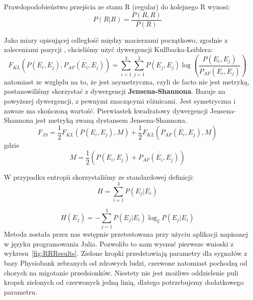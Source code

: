 Prawdopodobieństwo przejścia ze stanu R (regular) do kolejnego R wynosi:
\begin{equation}
P(R|R) = \frac{P(R,R)}{P(R)}
\end{equation}

Jako miary opisującej odległość między macierzami początkowo, zgodnie z zaleceniami pozycji \cite{Pedrycz}, 
chcieliśmy użyć dywergencji Kullbacka-Leiblera:
\begin{equation}
F_{KL}(P(E_i,E_j),\overline{P_{AF}(E_i,E_j)}) = \sum_{i=1}^3\sum_{j=1}^3P(E_j, E_j) \log\left(\frac{P(E_i, E_j)}{P_{AF}(E_i,E_j)} \right)
\end{equation}
natomiast ze względu na to, że jest asymetryczna, czyli de facto nie jest metryką, postanowiliśmy skorzystać z dywergencji \textbf{Jensena-Shannona}. 
Bazuje na powyższej dywergencji, z pewnymi znaczącymi różnicami.
Jest symetryczna i zawsze ma skończoną wartość.
Pierwiastek kwadratowy dywergencji Jensena-Shannona jest metryką zwaną dystansem Jensena-Shannona.
\begin{equation}
F_{JS} = \frac{1}{2}F_{KL}(P(E_i,E_j),M)+\frac{1}{2}F_{KL}(\overline{P_{AF}(E_i,E_j)},M)
\end{equation}
gdzie $$M = \frac{1}{2}(P(E_i,E_j)+\overline{P_{AF}(E_i,E_j)})$$

W przypadku entropii skorzystaliśmy ze standardowej definicji:
\begin{equation}
H = \sum_{i=1}^3 P(E_j|E_i) 
\end{equation}

\begin{equation}
H(E_j) = - \sum_{j=1}^3P(E_j|E_i)\log_2P(E_j|E_i)
\end{equation}
Metoda została przez nas wstępnie przetestowana przy użyciu aplikacji napisanej w języku programowania Julia. 
Pozwoliło to nam wysnuć pierwsze wnioski z wykresu~\ref{fig:RRResults}.
Zielone kropki przedstawiają parametry dla sygnałów z bazy Physiobank zebranych od zdrowych ludzi,
czerwone natomiast pochodzą od chorych na migotanie przedsionków. 
Niestety nie jest możliwe oddzielenie puli kropek zielonych od czerwonych jedną linią, 
dlatego potrzebujemy dodatkowego parametru.

